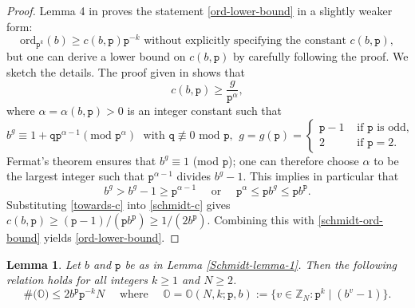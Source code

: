\documentclass[12pt, twoside]{article}
\newtheorem{lemma}[theorem]{Lemma}
\theoremstyle{definition}
\numberwithin{equation}{section}
\begin{document}
\begin{proof} 
Lemma 4 in \cite{s60} proves the statement \eqref{ord-lower-bound} in a slightly weaker form: 
\begin{equation} \label{schmidt-ord-bound} 
\text{ord}_{\mathtt p^k}(b) \geq c(b, \mathtt p) \mathtt p^{-k} \text{ without explicitly specifying the constant $c(b, \mathtt p)$},
\end{equation}  
but one can derive a lower bound on $c(b, \mathtt p)$ by carefully following the proof. We sketch the details. The proof given in \cite{s60} shows that 
\begin{equation} \label{schmidt-c} 
c(b, \mathtt p) \geq \frac{g}{\mathtt p^{\alpha}},
\end{equation}  
where $\alpha = \alpha(b, \mathtt p) > 0$ is an integer constant such that 
\begin{equation}  
b^{g} \equiv 1 + \mathtt q \mathtt p^{\alpha-1} (\text{mod } \mathtt p^{\alpha}) \;  \text{ with } \mathtt q \not\equiv 0 \text{ mod $\mathtt p$,} \; \;  g = g(\mathtt p) = \begin{cases} \mathtt p-1 &\text{ if $\mathtt p$ is odd}, \\ 2 &\text{ if } \mathtt p=2.  \end{cases} 
\end{equation} 
Fermat's theorem \cite[Theorem 71]{hw08} ensures that $b^{g} \equiv 1$ (mod $\mathtt p$); one can therefore choose $\alpha$ to be the largest integer such that $\mathtt p^{\alpha-1}$ divides $b^g-1$. This implies in particular that
\begin{equation} \label{towards-c}
b^{g} > b^g-1 \geq \mathtt p^{\alpha-1} \quad \text{ or } \quad \mathtt p^{\alpha} \leq \mathtt p b^{g} \leq \mathtt p b^{\mathtt p}.
\end{equation}     
Substituting \eqref{towards-c} into \eqref{schmidt-c} gives $c(b, \mathtt p) \geq (\mathtt p-1)/(\mathtt p b^{\mathtt p}) \geq 1/(2 b^{\mathtt p})$. Combining this with \eqref{schmidt-ord-bound} yields \eqref{ord-lower-bound}. 
\end{proof} 
\begin{lemma} \label{I1-lemma}
Let $b$ and $\mathtt p$ be as in Lemma \ref{Schmidt-lemma-1}. Then the following relation holds for all integers $k \geq 1$ and $N \geq 2$. 
\begin{equation} \label{W1-cardinality}
\# \bigl(\mathbb O \bigr)  \leq 2 b^{\mathtt p} \mathtt p^{-k} N \quad \text{ where } \quad \mathbb O = \mathbb O(N, k; \mathtt p, b) := \bigl\{v \in \mathbb Z_N: \mathtt p^{k} \mid (b^v-1) \bigr\}. 
\end{equation} 
\end{lemma}  
\end{document}
